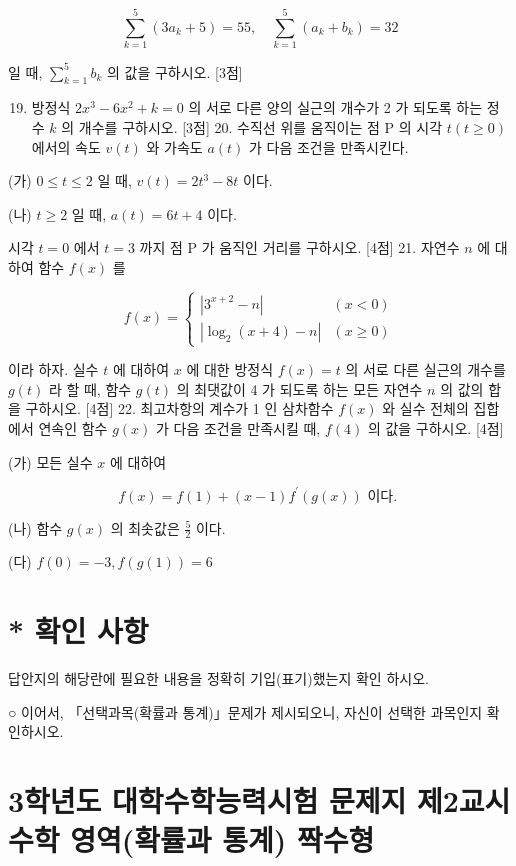 \documentclass[10pt]{article}
\begin{document}
$$
\sum_{k=1}^{5}\left(3 a_{k}+5\right)=55, \quad \sum_{k=1}^{5}\left(a_{k}+b_{k}\right)=32
$$

일 때, $\sum_{k=1}^{5} b_{k}$ 의 값을 구하시오. [3점]

\begin{enumerate}
  \setcounter{enumi}{18}
  \item 방정식 $2 x^{3}-6 x^{2}+k=0$ 의 서로 다른 양의 실근의 개수가 2 가 되도록 하는 정수 $k$ 의 개수를 구하시오. [3점] 20. 수직선 위를 움직이는 점 $\mathrm{P}$ 의 시각 $t(t \geq 0)$ 에서의 속도 $v(t)$ 와 가속도 $a(t)$ 가 다음 조건을 만족시킨다.
\end{enumerate}

(가) $0 \leq t \leq 2$ 일 때, $v(t)=2 t^{3}-8 t$ 이다.

(나) $t \geq 2$ 일 때, $a(t)=6 t+4$ 이다.

시각 $t=0$ 에서 $t=3$ 까지 점 $\mathrm{P}$ 가 움직인 거리를 구하시오. [4점] 21. 자연수 $n$ 에 대하여 함수 $f(x)$ 를

$$
f(x)= \begin{cases}\left|3^{x+2}-n\right| & (x<0) \\ \left|\log _{2}(x+4)-n\right| & (x \geq 0)\end{cases}
$$

이라 하자. 실수 $t$ 에 대하여 $x$ 에 대한 방정식 $f(x)=t$ 의 서로 다른 실근의 개수를 $g(t)$ 라 할 때, 함수 $g(t)$ 의 최댓값이 4 가 되도록 하는 모든 자연수 $n$ 의 값의 합을 구하시오. [4점] 22. 최고차항의 계수가 1 인 삼차함수 $f(x)$ 와 실수 전체의 집합에서 연속인 함수 $g(x)$ 가 다음 조건을 만족시킬 때, $f(4)$ 의 값을 구하시오. [4점]

(가) 모든 실수 $x$ 에 대하여

$$
f(x)=f(1)+(x-1) f^{\prime}(g(x)) \text { 이다. }
$$

(나) 함수 $g(x)$ 의 최솟값은 $\frac{5}{2}$ 이다.

(다) $f(0)=-3, f(g(1))=6$

\section{* 확인 사항}
답안지의 해당란에 필요한 내용을 정확히 기입(표기)했는지 확인 하시오.

○ 이어서, 「선택과목(확률과 통계)」문제가 제시되오니, 자신이 선택한 과목인지 확인하시오.

\section{3학년도 대학수학능력시험 문제지
제2교시 수학 영역(확률과 통계)
짝수형}
\end{document}
